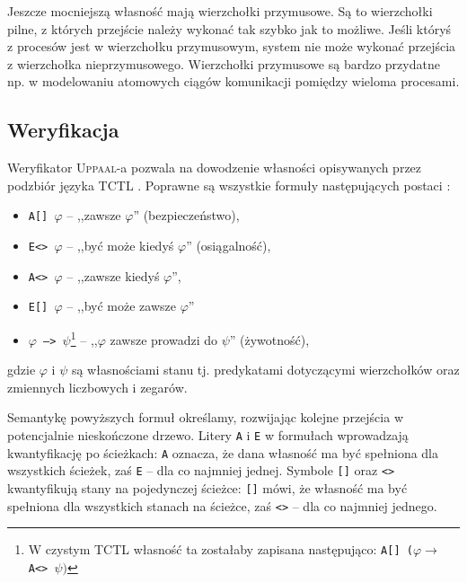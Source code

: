 \documentclass{pracamgr}
\newcommand{\upp}{\textsc{Uppaal}}
\theoremstyle{plain}
\begin{document}
Jeszcze mocniejszą własność mają wierzchołki przymusowe. Są to
wierzchołki pilne, z których przejście należy wykonać tak szybko jak
to możliwe. Jeśli któryś z procesów jest w wierzchołku przymusowym,
system nie może wykonać przejścia z wierzchołka nieprzymusowego.
Wierzchołki przymusowe są bardzo przydatne np. w modelowaniu atomowych
ciągów komunikacji pomiędzy wieloma procesami.

\subsection{Weryfikacja}

Weryfikator \upp-a pozwala na dowodzenie własności opisywanych przez
podzbiór języka TCTL \cite{acd:mc}. Poprawne są wszystkie formuły
następujących postaci \cite{by-lncs04}:
\begin{itemize}
  \item \texttt{A[] $\varphi$} -- ,,zawsze $\varphi$'' (bezpieczeństwo),
  \item \texttt{E<> $\varphi$} -- ,,być może kiedyś $\varphi$''
  (osiągalność),
  \item \texttt{A<> $\varphi$} -- ,,zawsze kiedyś $\varphi$'',
  \item \texttt{E[] $\varphi$} -- ,,być może zawsze $\varphi$''
  \item \texttt{$\varphi$ --> $\psi$}\footnote{W czystym TCTL własność
    ta zostałaby zapisana następująco: \texttt{A[]
      ($\varphi\rightarrow$ A<> $\psi)$}} -- ,,$\varphi$ zawsze
  prowadzi do $\psi$'' (żywotność),
\end{itemize}
gdzie $\varphi$ i $\psi$ są własnościami stanu tj. predykatami
dotyczącymi wierzchołków oraz zmiennych liczbowych i zegarów.

Semantykę powyższych formuł określamy, rozwijając kolejne
przejścia w potencjalnie nieskończone drzewo. Litery \texttt{A} i
\texttt{E} w formułach wprowadzają kwantyfikację po ścieżkach:
\texttt{A} oznacza, że dana własność ma być spełniona dla wszystkich
ścieżek, zaś \texttt{E} -- dla co najmniej jednej. Symbole
\texttt{[]} oraz \texttt{<>} kwantyfikują stany na pojedynczej
ścieżce: \texttt{[]} mówi, że własność ma być spełniona dla wszystkich
stanach na ścieżce, zaś \texttt{<>} -- dla co najmniej jednego. 
\end{document}

